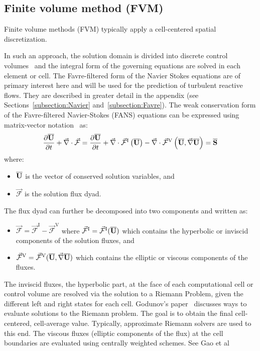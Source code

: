 \subsection{Finite volume method (FVM)}
Finite volume methods (FVM) typically apply a cell-centered spatial discretization. 

In such an approach, the solution domain is divided into
discrete control volumes~\cite{Toro:1997} and the integral form of the governing equations are solved in each element or cell. The Favre-filtered form of the Navier Stokes equations are of primary interest here and will be used for the prediction of turbulent reactive flows.  They are described
in greater detail in the appendix (see Sections~\ref{subsection:Navier} and~\ref{subsection:Favre}).
The weak conservation form of the Favre-filtered Navier-Stokes (FANS) equations can be expressed using matrix-vector notation~\cite{Neto:2014} as:
\begin{equation}
\label{eq:weak.form}
\frac{\partial \overline{\mathbf{U}}}{\partial t} 
+ \vec{\nabla} \cdot \vec{\mathcal{F}} =
\frac{\partial \overline{\mathbf{U}}}{\partial t} + 
\vec{\nabla} \cdot \vec{\mathcal{F}}^{\mathrm{I}} \left( \overline{\mathbf{U}} \right) - 
\vec{\nabla} \cdot \vec{\mathcal{F}}^{\mathrm{V}} 
\left( \overline{\mathbf{U}}, \vec{\nabla} \overline{\mathbf{U}} \right) = 
\overline{\mathbf{S}}
\end{equation}
where:
\begin{itemize}
 \item $\overline{\mathbf{U}}$ is the vector of conserved solution variables, and 
 \item $\vec{\mathcal{F}}$ is the solution flux dyad.
\end{itemize}  
 
The flux dyad can further be decomposed into two components and written as:
\begin{itemize}
\item $\vec{\mathcal{F}} =  \vec{\mathcal{F}}^{\mathrm I} - \vec{\mathcal{F}}^{\mathrm{V}}$ where $\vec{\mathcal{F}}^{\mathrm I} = \vec{\mathcal{F}}^{\mathrm I}(\overline{\mathbf{U}})$ which contains the hyperbolic or inviscid components of the solution fluxes, and 
\item $\vec{\mathcal{F}}^{\mathrm{V}} =  \vec{\mathcal{F}}^{\mathrm{V}}(\overline{\mathbf{U}}, \vec{\nabla} \overline{\mathbf{U}})$ which contains the elliptic or viscous components of the fluxes.
\end{itemize}

\noindent The inviscid fluxes, the hyperbolic part, at the face of each computational cell or control volume are resolved via the solution to a Riemann Problem, given the different left and right states for each cell. Godunov's paper~\cite{godunov:1959} discusses ways to evaluate solutions to the Riemann problem. The goal is to obtain the final cell-centered, cell-average value. Typically, approximate Riemann solvers are used to this end. The viscous fluxes (elliptic components of the flux) at the
cell boundaries are evaluated using centrally weighted
schemes. See Gao et al~\cite{gao:2006a, gao:2011}

